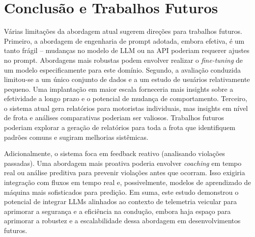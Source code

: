 \documentclass[12pt]{article}
\begin{document}
\section{Conclusão e Trabalhos Futuros}


Várias limitações da abordagem atual sugerem direções para trabalhos futuros. Primeiro, a abordagem de engenharia de prompt adotada, embora efetiva, é um tanto frágil – mudanças no modelo de LLM ou na API poderiam requerer ajustes no prompt. Abordagens mais robustas podem envolver realizar o \textit{fine-tuning} de um modelo especificamente para este domínio. Segundo, a avaliação conduzida limitou-se a um único conjunto de dados e a um estudo de usuários relativamente pequeno. Uma implantação em maior escala forneceria mais insights sobre a efetividade a longo prazo e o potencial de mudança de comportamento. Terceiro, o sistema atual gera relatórios para motoristas individuais, mas insights em nível de frota e análises comparativas poderiam ser valiosos. Trabalhos futuros poderiam explorar a geração de relatórios para toda a frota que identifiquem padrões comuns e sugiram melhorias sistêmicas.

Adicionalmente, o sistema foca em feedback reativo (analisando violações passadas). Uma abordagem mais proativa poderia envolver \textit{coaching} em tempo real ou análise preditiva para prevenir violações antes que ocorram. Isso exigiria integração com fluxos em tempo real e, possivelmente, modelos de aprendizado de máquina mais sofisticados para predição. Em suma, este estudo demonstrou o potencial de integrar LLMs alinhados ao contexto de telemetria veicular para aprimorar a segurança e a eficiência na condução, embora haja espaço para aprimorar a robustez e a escalabilidade dessa abordagem em desenvolvimentos futuros.




\end{document}

